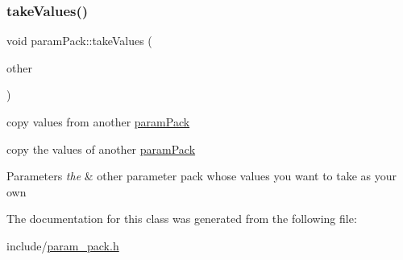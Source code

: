 \subsubsection{\texorpdfstring{take\+Values()}{takeValues()}}
{\footnotesize\ttfamily void param\+Pack\+::take\+Values (\begin{DoxyParamCaption}\item[{const \hyperlink{classparamPack}{param\+Pack} \&}]{other }\end{DoxyParamCaption})}



copy values from another \hyperlink{classparamPack}{param\+Pack} 

copy the values of another \hyperlink{classparamPack}{param\+Pack} 
\begin{DoxyParams}{Parameters}
{\em the} & other parameter pack whose values you want to take as your own \\
\hline
\end{DoxyParams}


The documentation for this class was generated from the following file\+:\begin{DoxyCompactItemize}
\item 
include/\hyperlink{param__pack_8h}{param\+\_\+pack.\+h}\end{DoxyCompactItemize}
